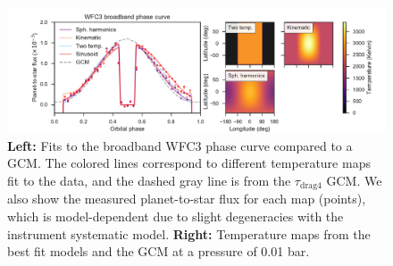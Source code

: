 \documentclass[twocolumn]{aastex61}
\begin{document}
\begin{figure}
\includegraphics[width = 1.0\textwidth, trim={1.5cm 0 0.5cm 0},clip]{Figures/hst_model_comparison.pdf}
\caption{\textbf{Left:} Fits to the broadband WFC3 phase curve compared to a GCM. The colored lines correspond to different temperature maps fit to the data, and the dashed gray line is from the $\tau_\mathrm{drag4}$ GCM. We also show the measured planet-to-star flux for each map (points), which is model-dependent due to slight degeneracies with the instrument systematic model.  \textbf{Right:} Temperature maps from the best fit models and the GCM at a pressure of 0.01 bar.}
\label{fig:model_comparison}
\end{figure}
\end{document}
